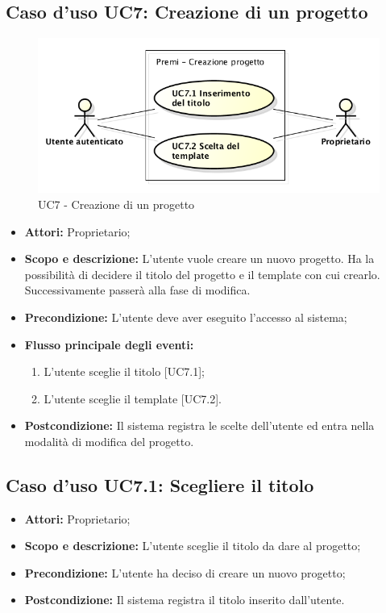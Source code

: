 \subsection{Caso d'uso UC7: Creazione di un progetto}
\begin{figure}[h] 
	\centering 
	\includegraphics[scale=0.45] {img/UC7.png}
	\caption{UC7 - Creazione di un progetto} 
\end{figure}

\begin{itemize}
	\item \textbf{Attori:} Proprietario;
	\item \textbf{Scopo e descrizione:} L'utente vuole creare un nuovo progetto. Ha la possibilità di decidere il titolo del progetto e il \gls{template} con cui crearlo. Successivamente passerà alla fase di modifica.
	\item \textbf{Precondizione:} L'utente deve aver eseguito l'accesso al sistema;
	\item \textbf{Flusso principale degli eventi:}
	\begin{enumerate}
		\item L'utente sceglie il titolo [UC7.1];
		\item L'utente sceglie il \gls{template} [UC7.2].
	\end{enumerate}
	\item \textbf{Postcondizione:} Il sistema registra le scelte dell'utente ed entra nella modalità di modifica del progetto.
\end{itemize}


\subsection{Caso d'uso UC7.1: Scegliere il titolo}
\begin{itemize}
	\item \textbf{Attori:} Proprietario;
	\item \textbf{Scopo e descrizione:} L'utente sceglie il titolo da dare al progetto;
	\item \textbf{Precondizione:} L'utente ha deciso di creare un nuovo progetto;
	\item \textbf{Postcondizione:} Il sistema registra il titolo inserito dall'utente.
\end{itemize}


